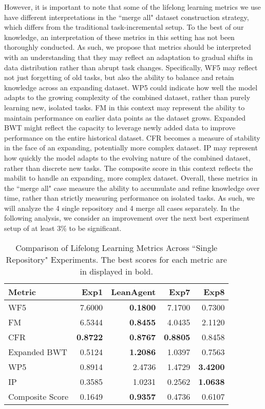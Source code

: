 \documentclass{article} %
\begin{document}

However, it is important to note that some of the lifelong learning metrics we use have different interpretations in the ``merge all" dataset construction strategy, which differs from the traditional task-incremental setup. To the best of our knowledge, an interpretation of these metrics in this setting has not been thoroughly conducted. As such, we propose that metrics should be interpreted with an understanding that they may reflect an adaptation to gradual shifts in data distribution rather than abrupt task changes. Specifically, WF5 may reflect not just forgetting of old tasks, but also the ability to balance and retain knowledge across an expanding dataset. WP5 could indicate how well the model adapts to the growing complexity of the combined dataset, rather than purely learning new, isolated tasks. FM in this context may represent the ability to maintain performance on earlier data points as the dataset grows. Expanded BWT might reflect the capacity to leverage newly added data to improve performance on the entire historical dataset. CFR becomes a measure of stability in the face of an expanding, potentially more complex dataset. IP may represent how quickly the model adapts to the evolving nature of the combined dataset, rather than discrete new tasks. The composite score in this context reflects the mabilit to handle an expanding, more complex dataset. Overall, these metrics in the ``merge all" case measure the ability to accumulate and refine knowledge over time, rather than strictly measuring performance on isolated tasks. As such, we will analyze the 4 single repository and 4 merge all cases separately. In the following analysis, we consider an improvement over the next best experiment setup of at least 3\% to be significant.


\begin{table}
\caption{Comparison of Lifelong Learning Metrics Across ``Single Repository" Experiments. The best scores for each metric are in displayed in bold.}
\label{tab:experiment-metrics}
\centering
\begin{tabular}{lrrrr}
\hline
Metric & Exp1 & LeanAgent & Exp7 & Exp8 \\
\hline
WF5 & 7.6000 & \textbf{0.1800} & 7.1700 & 0.7300 \\
FM & 6.5344 & \textbf{0.8455} & 4.0435 & 2.1120 \\
CFR & \textbf{0.8722} & \textbf{0.8767} & \textbf{0.8805} & 0.8458 \\
Expanded BWT & 0.5124 & \textbf{1.2086} & 1.0397 & 0.7563 \\
WP5 & 0.8914 & 2.4736 & 1.4729 & \textbf{3.4200} \\
IP & 0.3585 & 1.0231 & 0.2562 & \textbf{1.0638} \\
\hline
Composite Score & 0.1649 & \textbf{0.9357} & 0.4736 & 0.6107 \\
\hline
\end{tabular}
\end{table}
\end{document}
